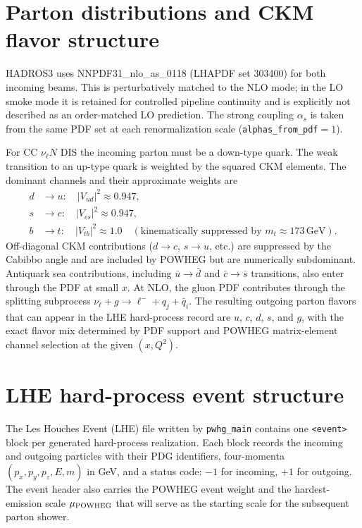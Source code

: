 \documentclass[11pt,a4paper]{report}
\numberwithin{equation}{chapter}
\begin{document}
\section{Parton distributions and CKM flavor structure}

HADROS3 uses NNPDF31\_nlo\_as\_0118 (LHAPDF set 303400) for both incoming
beams. This is perturbatively matched to the NLO mode; in the LO smoke mode it
is retained for controlled pipeline continuity and is explicitly not described
as an order-matched LO prediction. The strong coupling $\alpha_s$ is taken from
the same PDF set at each renormalization scale
(\texttt{alphas\_from\_pdf}$=1$).

For CC $\nu_\ell N$ DIS the incoming parton must be a down-type quark. The
weak transition to an up-type quark is weighted by the squared CKM elements.
The dominant channels and their approximate weights are
\begin{align}
d &\to u: \quad |V_{ud}|^2 \approx 0.947,\\
s &\to c: \quad |V_{cs}|^2 \approx 0.947,\\
b &\to t: \quad |V_{tb}|^2 \approx 1.0
            \quad (\text{kinematically suppressed by }m_t \approx 173\,\mathrm{GeV}).
\end{align}
Off-diagonal CKM contributions ($d\to c$, $s\to u$, etc.) are suppressed by
the Cabibbo angle and are included by POWHEG but are numerically subdominant.
Antiquark sea contributions, including $\bar{u}\to \bar{d}$ and
$\bar{c}\to \bar{s}$ transitions, also enter through the PDF at small $x$.
At NLO, the gluon PDF contributes through the splitting subprocess
$\nu_\ell + g\to \ell^- + q_j + \bar{q}_i$. The resulting outgoing
parton flavors that can appear in the LHE hard-process record are
$u$, $c$, $d$, $s$, and $g$, with the exact flavor mix determined by
PDF support and POWHEG matrix-element channel selection at the given $(x,Q^2)$.

\section{LHE hard-process event structure}

The Les Houches Event (LHE) file written by \texttt{pwhg\_main} contains one
\texttt{<event>} block per generated hard-process realization. Each block
records the incoming and outgoing particles with their PDG identifiers,
four-momenta $(p_x,p_y,p_z,E,m)$ in GeV, and a status code: $-1$ for
incoming, $+1$ for outgoing. The event header also carries the POWHEG event
weight and the hardest-emission scale $\mu_{\rm POWHEG}$ that will serve as
the starting scale for the subsequent parton shower.
\end{document}
